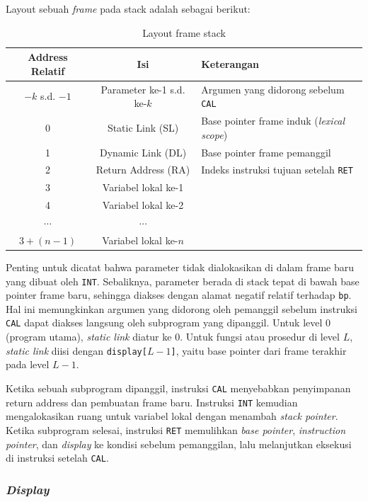 \documentclass[12pt,a4paper]{article}
\begin{document}
Layout sebuah \textit{frame} pada stack adalah sebagai berikut:

\begin{table}[H]
\centering
\caption{Layout frame stack}
\begin{tabular}{ccl}
\toprule
\textbf{Address Relatif} & \textbf{Isi} & \textbf{Keterangan} \\
\midrule
$-k$ s.d. $-1$ & Parameter ke-1 s.d. ke-$k$ & Argumen yang didorong sebelum \texttt{CAL} \\
0 & Static Link (SL) & Base pointer frame induk (\textit{lexical scope}) \\
1 & Dynamic Link (DL) & Base pointer frame pemanggil \\
2 & Return Address (RA) & Indeks instruksi tujuan setelah \texttt{RET} \\
3 & Variabel lokal ke-1 & \\
4 & Variabel lokal ke-2 & \\
$\cdots$ & $\cdots$ & \\
$3 + (n-1)$ & Variabel lokal ke-$n$ & \\
\bottomrule
\end{tabular}
\end{table}

Penting untuk dicatat bahwa parameter tidak dialokasikan di dalam frame baru
yang dibuat oleh \texttt{INT}. Sebaliknya, parameter berada di stack tepat
di bawah base pointer frame baru, sehingga diakses dengan alamat negatif relatif
terhadap \texttt{bp}. Hal ini memungkinkan argumen yang didorong oleh pemanggil
sebelum instruksi \texttt{CAL} dapat diakses langsung oleh subprogram yang
dipanggil. Untuk level 0 (program utama), \textit{static link} diatur ke 0.
Untuk fungsi atau prosedur di level $L$, \textit{static link} diisi dengan
\texttt{display[$L-1$]}, yaitu base pointer dari frame terakhir pada level
$L-1$.

Ketika sebuah subprogram dipanggil, instruksi \texttt{CAL} menyebabkan
penyimpanan return address dan pembuatan frame baru. Instruksi \texttt{INT}
kemudian mengalokasikan ruang untuk variabel lokal dengan menambah
\textit{stack pointer}. Ketika subprogram selesai, instruksi \texttt{RET}
memulihkan \textit{base pointer}, \textit{instruction pointer}, dan
\textit{display} ke kondisi sebelum pemanggilan, lalu melanjutkan eksekusi
di instruksi setelah \texttt{CAL}.

\subsubsection{\textit{Display}}
\end{document}
